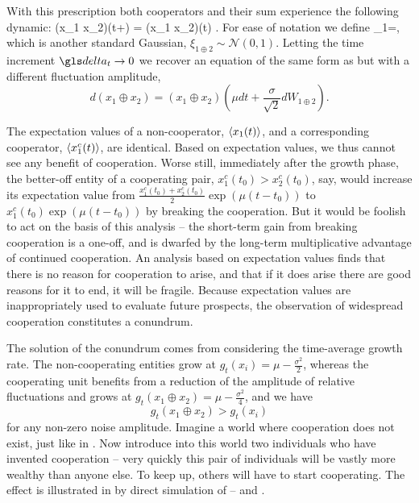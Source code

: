 With this prescription both cooperators and their sum experience the following dynamic:
 \be
 (x_1 \oplus x_2)(t+\dt) =
 (x_1 \oplus x_2)(t) .
 \ee
 For ease of notation we define
 \be
 \xi_{1}=,
 \ee
 which is another standard Gaussian, $\xi_{1\oplus2} \sim \mathcal{N}(0,1)$. Letting the time
 increment $\dt \to 0$ we recover an equation of the same form as
  but with a different fluctuation amplitude,
 \begin{equation}
 d(x_1 \oplus x_2) = (x_1 \oplus x_2)\left(\mu dt +\frac{\sigma}{\sqrt{2}} dW_{1\oplus2}\right).
 \end{equation}
 
The expectation values of a non-cooperator, $\left\langle x_1(t) \right\rangle$, and a corresponding cooperator,
$\left\langle x^c_1(t) \right\rangle$, are identical. Based on expectation values, we thus cannot 
 see any benefit of cooperation. Worse still, immediately after the growth phase, the 
 better-off entity of a cooperating pair, $x^c_1(t_0)>x^c_2(t_0)$, say, would increase its expectation value from 
$\frac{x^c_1(t_0)+x^c_2(t_0)}{2}\exp(\mu (t-t_0))$ to $x^c_1(t_0)\exp(\mu (t-t_0))$
by breaking the cooperation. But it would be foolish to act on the basis of this analysis --
the short-term gain from breaking cooperation is a one-off, and is dwarfed by the long-term
multiplicative advantage of continued cooperation. 
An analysis based on expectation values finds that there is no reason for 
cooperation to arise, and that if it does arise there are good reasons for it to end, 
\ie it will be fragile. Because expectation values are inappropriately used to evaluate 
future prospects, the observation of widespread cooperation constitutes a conundrum. 

The solution of the conundrum comes from considering the time-average
growth rate. The non-cooperating entities grow at $g_{t}(x_i)=\mu-\frac{\sigma^2}{2}$, 
whereas the cooperating unit benefits from a reduction of the amplitude of relative 
fluctuations and grows at $g_{t}(x_1\oplus x_2)=\mu-\frac{\sigma^2}{4}$, 
and we have
\begin{equation}
g_{t}(x_1\oplus x_2)>g_{t}(x_i)
\end{equation}
for any non-zero noise amplitude. Imagine a world where cooperation does not exist, 
just like in . Now introduce into this world two individuals who have 
invented cooperation -- very quickly this pair of individuals will be vastly more wealthy than
anyone else. To keep up, others will have to start cooperating. The effect is illustrated 
in  by direct simulation of
-- and .

